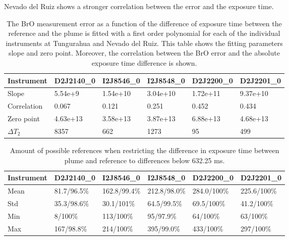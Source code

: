 Nevado del Ruiz shows a stronger correlation between the   error and the exposure time.
\begin{table}[h]
	\centering
	\begin{tabular}{|p{2cm}|p{2cm}|p{2cm}|p{2cm}|p{2cm}|p{2cm}|}
		Instrument	&D2J2140\_0&I2J8546\_0& I2J8548\_0&D2J2200\_0&D2J2201\_0\\
		\toprule
		Slope& 5.54e+9&1.54e+10 &3.04e+10&1.72e+11&9.37e+10\\
		\midrule
		Correlation&0.067
		&0.121&
		0.251&
		0.452&
		0.434\\
		\midrule
		Zero point&4.63e+13&3.58e+13& 3.87e+13& 6.88e+13& 4.68e+13\\
		\midrule
		$\Delta T_{2}$&8357&662&1273&95&499\\
		\bottomrule
	\end{tabular}
	\caption{The BrO measurement error as a function of the difference of exposure time between the reference and the plume is fitted with a first order polynomial for each of the individual instruments at Tungurahua and Nevado del Ruiz. This table shows the fitting parameters slope and zero point. Moreover, the correlation between the BrO error and the absolute exposure time difference is shown.}
	\label{tab:exptimecalc}
\end{table}

\begin{table}
	\centering
	\begin{tabular}{|p{1.8cm}|p{2.15cm}|p{2.15cm}|p{2.15cm}|p{2.15cm}|p{2.15cm}|}
		Instrument	&D2J2140\_0&I2J8546\_0& I2J8548\_0&D2J2200\_0&D2J2201\_0\\
		\toprule
		Mean&
		81.7/96.5\%		&162.8/99.4\%		&212.8/98.0\%		&284.0/100\%		&225.6/100\% \\
		\midrule
		Std&
		35.3/98.6\%&		30.1/101\%&
		64.5/99.5\% &		69.5/100\% &
		41.2/100\% \\
		\midrule
		Min  &
		8/100\%&113/100\%
		&95/97.9\%
		&64/100\%
		&63/100\%\\
		\midrule
		Max&
		167/98.8\% &
		214/100\% &
		395/99.0\% &
		433/100\%  &
		297/100\% \\
		\bottomrule
	\end{tabular}
	\caption{Amount of possible references when restricting the difference in exposure time  between plume and reference to differences below 632.25 ms.}
	\label{tab:etrest}
\end{table}	


